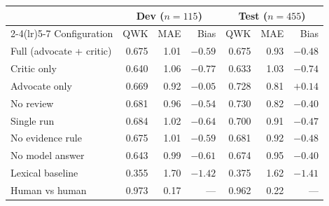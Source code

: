 \begin{tabular}{lrrrrrr}
\toprule
& \multicolumn{3}{c}{Dev ($n=115$)} & \multicolumn{3}{c}{Test ($n=455$)} \\
\cmidrule(lr){2-4}\cmidrule(lr){5-7}
Configuration & QWK & MAE & Bias & QWK & MAE & Bias \\
\midrule
Full (advocate + critic) & 0.675 & 1.01 & $-0.59$ & 0.675 & 0.93 & $-0.48$ \\
Critic only & 0.640 & 1.06 & $-0.77$ & 0.633 & 1.03 & $-0.74$ \\
Advocate only & 0.669 & 0.92 & $-0.05$ & 0.728 & 0.81 & $+0.14$ \\
No review & 0.681 & 0.96 & $-0.54$ & 0.730 & 0.82 & $-0.40$ \\
Single run & 0.684 & 1.02 & $-0.64$ & 0.700 & 0.91 & $-0.47$ \\
No evidence rule & 0.675 & 1.01 & $-0.59$ & 0.681 & 0.92 & $-0.48$ \\
No model answer & 0.643 & 0.99 & $-0.61$ & 0.674 & 0.95 & $-0.40$ \\
Lexical baseline & 0.355 & 1.70 & $-1.42$ & 0.375 & 1.62 & $-1.41$ \\
Human vs human & 0.973 & 0.17 & --- & 0.962 & 0.22 & --- \\
\bottomrule
\end{tabular}

